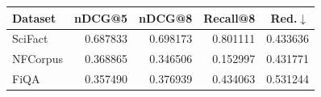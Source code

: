 \begin{tabular}{lrrrr}
\toprule
Dataset & nDCG@5 & nDCG@8 & Recall@8 & Red.$\downarrow$\\
\midrule
SciFact & 0.687833 & 0.698173 & 0.801111 & 0.433636\\
NFCorpus & 0.368865 & 0.346506 & 0.152997 & 0.431771\\
FiQA & 0.357490 & 0.376939 & 0.434063 & 0.531244\\
\bottomrule
\end{tabular}
